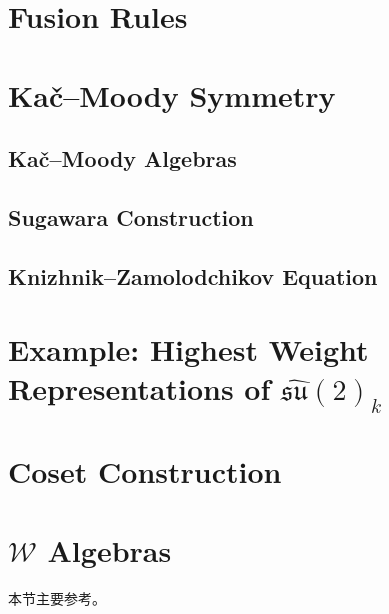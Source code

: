 \section{Fusion Rules}
\section{Ka\v{c}\mbox{–}Moody Symmetry}
\subsection{Ka\v{c}\mbox{–}Moody Algebras}
\subsection{Sugawara Construction}
\subsection{Knizhnik\mbox{–}Zamolodchikov Equation}
\section{Example: Highest Weight Representations of $\widehat{\mathfrak{su}}(2)_{k}$ }
\section{Coset Construction}
\section{$\mathcal{W}$ Algebras}
本节主要参考\cite{Pope:1991ig}。
